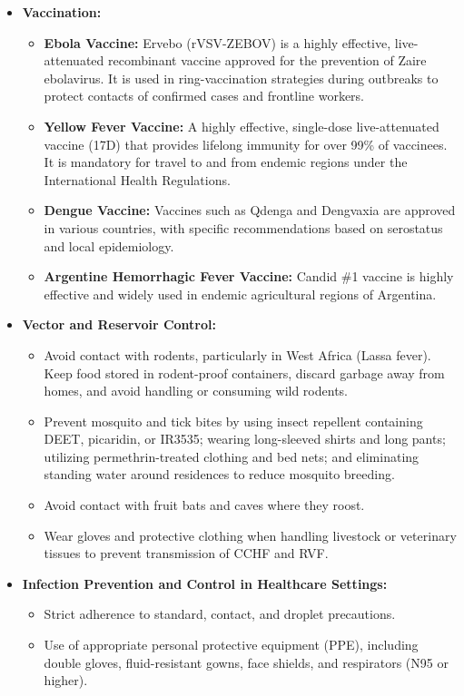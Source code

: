 \begin{itemize}
\item \textbf{Vaccination:}
  \begin{itemize}
  \item \textbf{Ebola Vaccine:} Ervebo (rVSV-ZEBOV) is a highly effective, live-attenuated recombinant vaccine approved for the prevention of Zaire ebolavirus. It is used in ring-vaccination strategies during outbreaks to protect contacts of confirmed cases and frontline workers.
  \item \textbf{Yellow Fever Vaccine:} A highly effective, single-dose live-attenuated vaccine (17D) that provides lifelong immunity for over 99\% of vaccinees. It is mandatory for travel to and from endemic regions under the International Health Regulations.
  \item \textbf{Dengue Vaccine:} Vaccines such as Qdenga and Dengvaxia are approved in various countries, with specific recommendations based on serostatus and local epidemiology.
  \item \textbf{Argentine Hemorrhagic Fever Vaccine:} Candid \#1 vaccine is highly effective and widely used in endemic agricultural regions of Argentina.
  \end{itemize}
\item \textbf{Vector and Reservoir Control:}
  \begin{itemize}
  \item Avoid contact with rodents, particularly in West Africa (Lassa fever). Keep food stored in rodent-proof containers, discard garbage away from homes, and avoid handling or consuming wild rodents.
  \item Prevent mosquito and tick bites by using insect repellent containing DEET, picaridin, or IR3535; wearing long-sleeved shirts and long pants; utilizing permethrin-treated clothing and bed nets; and eliminating standing water around residences to reduce mosquito breeding.
  \item Avoid contact with fruit bats and caves where they roost.
  \item Wear gloves and protective clothing when handling livestock or veterinary tissues to prevent transmission of CCHF and RVF.
  \end{itemize}
\item \textbf{Infection Prevention and Control in Healthcare Settings:}
  \begin{itemize}
  \item Strict adherence to standard, contact, and droplet precautions.
  \item Use of appropriate personal protective equipment (PPE), including double gloves, fluid-resistant gowns, face shields, and respirators (N95 or higher).

\end{itemize}
\end{itemize}
